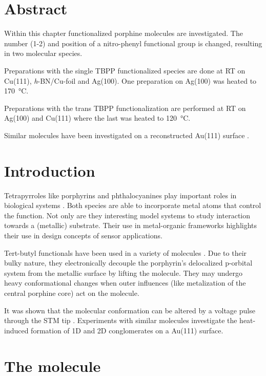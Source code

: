 \label{section:TBP}
\section{Abstract}
Within this chapter functionalized porphine molecules are investigated. The number (1-2) and position of a nitro-phenyl functional group is changed, resulting in two molecular species.

Preparations with the single TBPP functionalized species are done at RT on Cu(111), \textit{h}-BN/Cu-foil and Ag(100). One preparation on Ag(100) was heated to \SI{170}{\celsius}. 

Preparations with the trans TBPP functionalization are performed at RT on Ag(100) and Cu(111) where the last was heated to \SI{120}{\celsius}.

Similar molecules have been investigated on a reconstructed Au(111) surface \cite{yokoyama_selective_2001}.

\section{Introduction}
Tetrapyrroles like porphyrins and phthalocyanines play important roles in biological systems \cite{battersby_tetrapyrroles_2000}. Both species are able to incorporate metal atoms that control the function. Not only are they interesting model systems to study interaction towards a (metallic) substrate\cite{auwarter_porphyrins_2015, auwarter_controlled_2007, diller_vacuo_2016}. Their use in metal-organic frameworks highlights their use in design concepts of sensor applications.\cite{Lustig_Metal-organic_2017}

Tert-butyl functionals have been used in a variety of molecules .\cite{moresco_conformational_2001} Due to their bulky nature, they electronically decouple the porphyrin’s delocalized p-orbital system from the metallic surface by lifting the molecule. They may undergo heavy conformational changes when outer influences (like metalization of the central porphine core) act on the molecule. \cite{stark_massive_2014}

It was shown that the molecular conformation can be altered by
a voltage pulse through the STM tip \cite{loppacher_direct_2003,ditze_energetics_2014}. Experiments with similar molecules investigate the heat-induced formation of 1D and 2D conglomerates on a Au(111) surface.\cite{pham_heat-induced_2015}

\section{The molecule}

